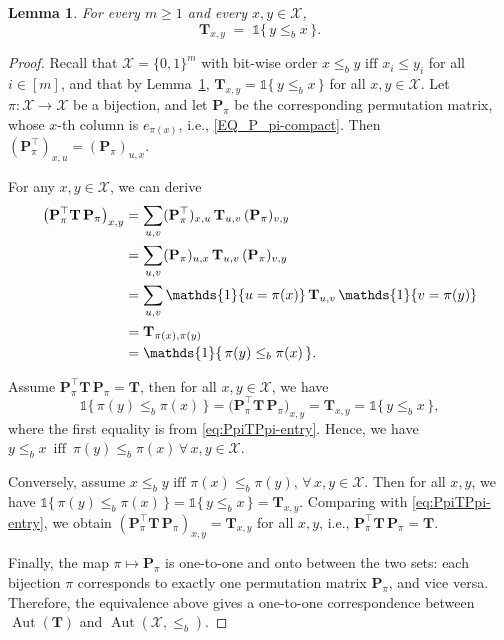 \documentclass[10pt,a4paper]{amsart}
\newtheorem{lemma}{Lemma}
\DeclareMathOperator{\Aut}{Aut}
\begin{document}
\begin{lemma}\label{lem:polar-incidence}
For every $m\ge 1$ and every $x,y\in\mathcal{X}$,
\begin{equation}\label{eq:T-encodes-order-compact}
  \mathbf T_{x,y}
  \;=\;  \mathds{1}\{\,y \le_b x\,\}.
\end{equation}
\end{lemma}

\begin{proof}
Recall that \(\mathcal{X}=\{0,1\}^m\) with bit-wise order
\(x\le_b y \mbox{ iff } x_i\le y_i\) for all \(i\in[m]\), and that by
Lemma~\ref{lem:polar-incidence},
\(
  \mathbf{T}_{x,y} = \mathds{1}\{\,y\le_b x\,\}
\)
for all \(x,y\in\mathcal{X}\). Let \(\pi:\mathcal{X}\to\mathcal{X}\) be a bijection, and let
\(\mathbf{P}_\pi\) be the corresponding permutation matrix, whose
\(x\)-th column is \(e_{\pi(x)}\), i.e., \eqref{EQ_P_pi-compact}. 
Then \((\mathbf{P}_\pi^{\top})_{x,u} = (\mathbf{P}_\pi)_{u,x}\).

For any \(x,y\in\mathcal{X}\), we can derive
\begin{align}
  \bigl(\mathbf{P}_\pi^{\top}\mathbf{T}\,\mathbf{P}_\pi\bigr)_{x,y}
  &= \sum_{u,v}
     (\mathbf{P}_\pi^{\top})_{x,u}\,\mathbf{T}_{u,v}\,(\mathbf{P}_\pi)_{v,y}\notag\\
  &= \sum_{u,v}
     (\mathbf{P}_\pi)_{u,x}\,\mathbf{T}_{u,v}\,(\mathbf{P}_\pi)_{v,y}\notag\\
  &= \sum_{u,v}
     \mathds{1}\{u=\pi(x)\}\,\mathbf{T}_{u,v}\,\mathds{1}\{v=\pi(y)\}\label{EQ_Aut_expansion}\\
  &= \mathbf{T}_{\pi(x),\pi(y)}\label{EQ_Aut_expansion2}\\
  &= \mathds{1}\{\,\pi(y)\le_b \pi(x)\,\}.  \label{eq:PpiTPpi-entry}
\end{align}

Assume \(\mathbf{P}_\pi^{\top}\mathbf{T}\,\mathbf{P}_\pi=\mathbf{T}\), then for all \(x,y\in\mathcal{X}\), we have
\[
  \mathds{1}\{\,\pi(y)\le_b \pi(x)\,\}
  = \bigl(\mathbf{P}_\pi^{\top}\mathbf{T}\,\mathbf{P}_\pi\bigr)_{x,y}
  = \mathbf{T}_{x,y}
  = \mathds{1}\{\,y\le_b x\,\},
\]
where the first equality is from \eqref{eq:PpiTPpi-entry}. Hence, we have $ y\le_b x  \,\mbox{ iff }\,  \pi(y)\le_b \pi(x)  \,\forall\,x,y\in\mathcal{X}.$ 

Conversely, assume  $  x\le_b y \mbox{ iff } \pi(x)\le_b \pi(y),  \,\forall\,x,y\in\mathcal{X}.$
Then for all \(x,y\), we have $  \mathds{1}\{\,\pi(y)\le_b \pi(x)\,\}  = \mathds{1}\{\,y\le_b x\,\}  = \mathbf{T}_{x,y}.$
Comparing with \eqref{eq:PpiTPpi-entry}, we obtain
\((\mathbf{P}_\pi^{\top}\mathbf{T}\,\mathbf{P}_\pi)_{x,y} = \mathbf{T}_{x,y}\)
for all \(x,y\), i.e.,
\(
  \mathbf{P}_\pi^{\top}\mathbf{T}\,\mathbf{P}_\pi = \mathbf{T}.
\)


Finally, the map \(\pi\mapsto \mathbf{P}_\pi\) is one-to-one and onto between the two sets:
each bijection \(\pi\) corresponds to exactly one permutation matrix \(\mathbf{P}_\pi\), and vice versa.
Therefore, the equivalence above gives a one-to-one correspondence between \(\Aut(\mathbf{T})\)
and \(\Aut(\mathcal{X},\le_b)\).

\end{proof}
\end{document}
